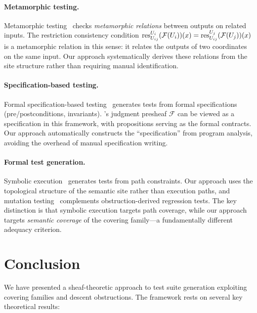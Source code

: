 \documentclass[11pt]{article}
\begin{document}
\paragraph{Metamorphic testing.}
Metamorphic testing~\cite{Chen2018} checks \emph{metamorphic relations}
between outputs on related inputs.  The restriction consistency condition
$\mathrm{res}_{U_{ij}}^{U_i}(\mathcal{F}(U_i))(x) =
\mathrm{res}_{U_{ij}}^{U_j}(\mathcal{F}(U_j))(x)$ is a metamorphic relation
in this sense: it relates the outputs of two coordinates on the same
input.  Our approach systematically derives these relations from the
site structure rather than requiring manual identification.

\paragraph{Specification-based testing.}
Formal specification-based testing~\cite{Hierons2009} generates tests from
formal specifications (pre/postconditions, invariants).  \JuGeo's judgment
presheaf $\mathcal{F}$ can be viewed as a specification in this framework,
with propositions serving as the formal contracts.  Our approach
automatically constructs the ``specification'' from program analysis,
avoiding the overhead of manual specification writing.

\paragraph{Formal test generation.}
Symbolic execution~\cite{King1976,Cadar2008} generates tests from path
constraints.  Our approach uses the topological structure of the semantic
site rather than execution paths, and mutation testing~\cite{Jia2011}
complements obstruction-derived regression tests.  The key distinction
is that symbolic execution targets path coverage, while our approach
targets \emph{semantic coverage} of the covering family---a fundamentally
different adequacy criterion.

\section{Conclusion}\label{sec:conclusion}

We have presented a sheaf-theoretic approach to test suite generation
exploiting covering families and descent obstructions.  The framework
rests on several key theoretical results:
\end{document}
